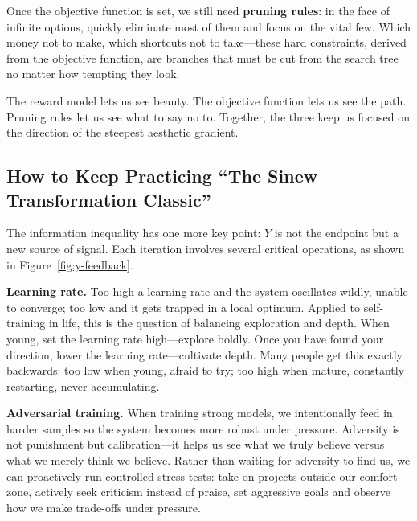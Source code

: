 \vspace{1em}

Once the objective function is set, we still need \textbf{pruning rules}: in the face of infinite options, quickly eliminate most of them and focus on the vital few. Which money not to make, which shortcuts not to take---these hard constraints, derived from the objective function, are branches that must be cut from the search tree no matter how tempting they look.

\vspace{1em}

The reward model lets us see beauty. The objective function lets us see the path. Pruning rules let us see what to say no to. Together, the three keep us focused on the direction of the steepest aesthetic gradient.

\newpage
\subsection{How to Keep Practicing ``The Sinew Transformation Classic''}

The information inequality has one more key point: $Y$ is not the endpoint but a new source of signal. Each iteration involves several critical operations, as shown in Figure~\ref{fig:y-feedback}.



\textbf{Learning rate.} Too high a learning rate and the system oscillates wildly, unable to converge; too low and it gets trapped in a local optimum. Applied to self-training in life, this is the question of balancing exploration and depth. When young, set the learning rate high---explore boldly. Once you have found your direction, lower the learning rate---cultivate depth. Many people get this exactly backwards: too low when young, afraid to try; too high when mature, constantly restarting, never accumulating.

\vspace{1em}

\textbf{Adversarial training.} When training strong models, we intentionally feed in harder samples so the system becomes more robust under pressure. Adversity is not punishment but calibration---it helps us see what we truly believe versus what we merely think we believe. Rather than waiting for adversity to find us, we can proactively run controlled stress tests: take on projects outside our comfort zone, actively seek criticism instead of praise, set aggressive goals and observe how we make trade-offs under pressure.

